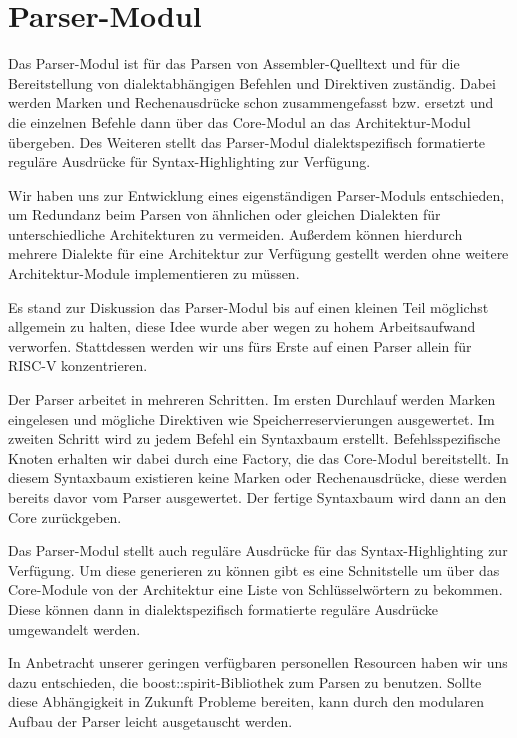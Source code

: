 \documentclass{scrartcl}
\begin{document}
\section{Parser-Modul}

Das Parser-Modul ist für das Parsen von Assembler-Quelltext und für die Bereitstellung von dialektabhängigen Befehlen und Direktiven zuständig. Dabei werden Marken und Rechenausdrücke schon zusammengefasst bzw. ersetzt und die einzelnen Befehle dann über das Core-Modul an das Architektur-Modul übergeben. Des Weiteren stellt das Parser-Modul dialektspezifisch formatierte reguläre Ausdrücke für Syntax-Highlighting zur Verfügung.

Wir haben uns zur Entwicklung eines eigenständigen Parser-Moduls entschieden, um Redundanz beim Parsen von ähnlichen oder gleichen Dialekten für unterschiedliche Architekturen zu vermeiden. Außerdem können hierdurch mehrere Dialekte für eine Architektur zur Verfügung gestellt werden ohne weitere Architektur-Module implementieren zu müssen.

Es stand zur Diskussion das Parser-Modul bis auf einen kleinen Teil möglichst allgemein zu halten, diese Idee wurde aber wegen zu hohem Arbeitsaufwand verworfen. Stattdessen werden wir uns fürs Erste auf einen Parser allein für RISC-V konzentrieren.

Der Parser arbeitet in mehreren Schritten. Im ersten Durchlauf werden Marken eingelesen und mögliche Direktiven wie Speicherreservierungen ausgewertet. Im zweiten Schritt wird zu jedem Befehl ein Syntaxbaum erstellt. Befehlsspezifische Knoten erhalten wir dabei durch eine Factory, die das Core-Modul bereitstellt. In diesem Syntaxbaum existieren keine Marken oder Rechenausdrücke, diese werden bereits davor vom Parser ausgewertet. Der fertige Syntaxbaum wird dann an den Core zurückgeben.

Das Parser-Modul stellt auch reguläre Ausdrücke für das Syntax-Highlighting zur Verfügung. Um diese generieren zu können gibt es eine Schnitstelle um über das Core-Module von der Architektur eine Liste von Schlüsselwörtern zu bekommen. Diese können dann in dialektspezifisch formatierte reguläre Ausdrücke umgewandelt werden.

In Anbetracht unserer geringen verfügbaren personellen Resourcen haben wir uns dazu entschieden, die boost::spirit-Bibliothek zum Parsen zu benutzen. Sollte diese Abhängigkeit in Zukunft Probleme bereiten, kann durch den modularen Aufbau der Parser leicht ausgetauscht werden.
\end{document}
